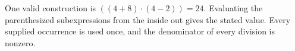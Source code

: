 One valid construction is $\boxed{((4+8)\cdot (4-2))=24}$. Evaluating the parenthesized subexpressions from the inside out gives the stated value. Every supplied occurrence is used once, and the denominator of every division is nonzero.

